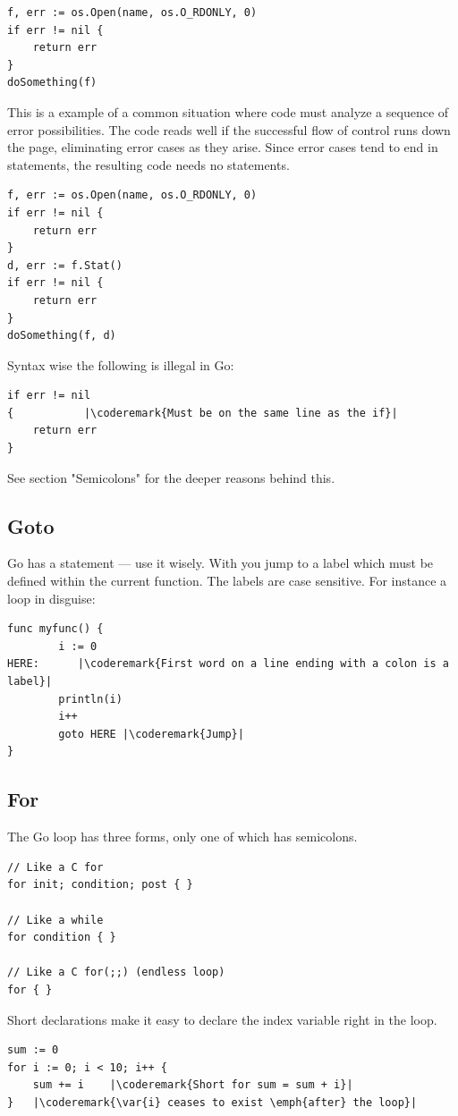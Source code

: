 \begin{lstlisting}
f, err := os.Open(name, os.O_RDONLY, 0)
if err != nil {
    return err
}
doSomething(f)
\end{lstlisting}
This is a example of a common situation where code must analyze a
sequence of error possibilities. The code reads well if the successful
flow of control runs down the page, eliminating error cases as they
arise. Since error cases tend to end in  statements, the resulting
code needs no  statements.
\begin{lstlisting}
f, err := os.Open(name, os.O_RDONLY, 0)
if err != nil {
    return err
}
d, err := f.Stat()
if err != nil {
    return err
}
doSomething(f, d)
\end{lstlisting}
Syntax wise the following is illegal in Go:
\begin{lstlisting}
if err != nil
{		    |\coderemark{Must be on the same line as the if}|
    return err
}
\end{lstlisting}
See \cite{effective_go} section "Semicolons" for the deeper reasons
behind this.

\subsection{Goto}
Go has a  statement --- use it wisely. With 
you jump to a label which must be defined within the current function.
The labels are case sensitive. 
For instance a loop in disguise:
\begin{lstlisting}
func myfunc() {
        i := 0                                                                                      
HERE:	   |\coderemark{First word on a line ending with a colon is a label}|
        println(i)
        i++ 
        goto HERE |\coderemark{Jump}|
}
\end{lstlisting}

\subsection{For}
\label{sec:for}
The Go  loop has three forms, only one of
which has semicolons.
\begin{lstlisting}
// Like a C for
for init; condition; post { }

// Like a while
for condition { }

// Like a C for(;;) (endless loop)
for { }
\end{lstlisting}
Short declarations make it easy to declare the index variable right in the loop.
\begin{lstlisting}
sum := 0
for i := 0; i < 10; i++ {
    sum += i	|\coderemark{Short for sum = sum + i}|
}   |\coderemark{\var{i} ceases to exist \emph{after} the loop}|
\end{lstlisting}

